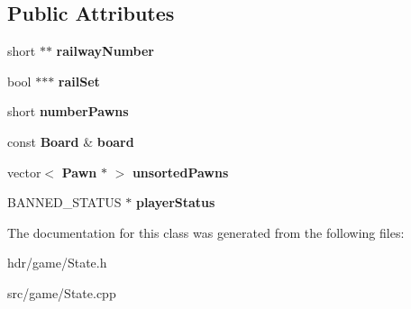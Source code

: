 \subsection*{Public Attributes}
\begin{DoxyCompactItemize}
\item 
short $\ast$$\ast$ {\bfseries railway\-Number}\label{class_state_aa894bfd06fe70d41f14527401d752bd6}

\item 
bool $\ast$$\ast$$\ast$ {\bfseries rail\-Set}\label{class_state_a06eec6ac8f191d3b7e6bfc85426e37c6}

\item 
short {\bfseries number\-Pawns}\label{class_state_a2bd881ff696f2807e54a4cc0b522f624}

\item 
const {\bf Board} \& {\bfseries board}\label{class_state_a74702298b35b8a798e85212bccff6daa}

\item 
vector$<$ {\bf Pawn} $\ast$ $>$ {\bfseries unsorted\-Pawns}\label{class_state_a7da42bb202d9bb967db82e1b8c65070e}

\item 
B\-A\-N\-N\-E\-D\-\_\-\-S\-T\-A\-T\-U\-S $\ast$ {\bfseries player\-Status}\label{class_state_ab6a551fe108a225babf4fa59e61d75cb}

\end{DoxyCompactItemize}


The documentation for this class was generated from the following files\-:\begin{DoxyCompactItemize}
\item 
hdr/game/State.\-h\item 
src/game/State.\-cpp\end{DoxyCompactItemize}
